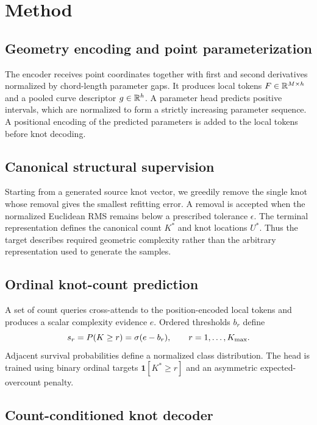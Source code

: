 \section{Method}
\label{sec:method}

\subsection{Geometry encoding and point parameterization}

The encoder receives point coordinates together with first and second
derivatives normalized by chord-length parameter gaps. It produces local tokens $F\in\mathbb{R}^{M\times h}$ and a pooled curve
descriptor $g\in\mathbb{R}^h$. A parameter head predicts positive intervals, which are
normalized to form a strictly increasing parameter sequence. A positional
encoding of the predicted parameters is added to the local tokens before knot
decoding.

\subsection{Canonical structural supervision}

Starting from a generated source knot vector, we greedily remove the single
knot whose removal gives the smallest refitting error. A removal is accepted
when the normalized Euclidean RMS remains below a prescribed tolerance
$\epsilon$. The terminal representation defines the canonical count $K^*$ and
knot locations $U^*$. Thus the target describes required geometric complexity
rather than the arbitrary representation used to generate the samples.

\subsection{Ordinal knot-count prediction}

A set of count queries cross-attends to the position-encoded local tokens and
produces a scalar complexity evidence $e$. Ordered thresholds $b_r$ define
\begin{equation}
  s_r=P(K\ge r)=\sigma(e-b_r),\qquad r=1,\ldots,K_{\max}.
\end{equation}
Adjacent survival probabilities define a normalized class distribution. The
head is trained using binary ordinal targets $\mathbf 1[K^*\ge r]$ and an
asymmetric expected-overcount penalty.

\subsection{Count-conditioned knot decoder}

